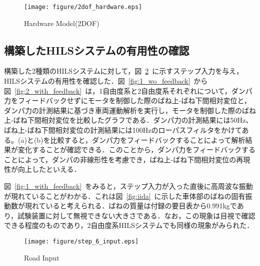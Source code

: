 \documentclass[a4paper,12pt]{article_vdlab_sotsuron}
\begin{document}
\vspace*{10mm}
\begin{figure}[htp]
  \begin{center}
    \texttt{[image: figure/2dof\_hardware.eps]}
    \vspace*{3mm}
    \caption{Hardware Model(2DOF)}
    \label{fig:2dof_hardware}
  \end{center}
\end{figure}

\newpage
\subsection{構築したHILSシステムの有用性の確認}
構築した2種類のHILSシステムに対して，図~\ref{fig:step_6_input}~に示すステップ入力を与え，HILSシステムの有用性を確認した．図~\ref{fig:1_wo_feedback}~から図~\ref{fig:2_with_feedback}~は，1自由度系と2自由度系それぞれについて，ダンパ力をフィードバックせずにモータを制御した際のばね上-ばね下間相対変位と，ダンパ力の計測結果に基づき車両運動解析を実行し，モータを制御した際のばね上-ばね下間相対変位を比較したグラフである．ダンパ力の計測結果には50Hz、ばね上-ばね下間相対変位の計測結果には100Hzのローパスフィルタをかけてある。(a)と(b)を比較すると，ダンパ力をフィードバックすることによって解析結果が変化することが確認できる．このことから，ダンパ力をフィードバックすることによって，ダンパの非線形性を考慮でき，ばね上-ばね下間相対変位の再現性が向上したといえる．\par
図~\ref{fig:1_with_feedback}~をみると，ステップ入力が入った直後に高周波な振動が現れていることがわかる．これは図~\ref{fig:iida}~に示した車体部のばねの固有振動数が現れていると考えられる．ばねの質量は付録の要目表から0.991kgであり，試験装置に対して無視できない大きさである．なお，この現象は目視で確認できる程度のものであり，2自由度系HILSシステムでも同様の現象がみられた．

\vspace*{10mm}
\begin{figure}[htp]
  \begin{center}
    \texttt{[image: figure/step\_6\_input.eps]}
    \vspace*{3mm}
    \caption{Road Input}
    \label{fig:step_6_input}
  \end{center}
\end{figure}
\end{document}
